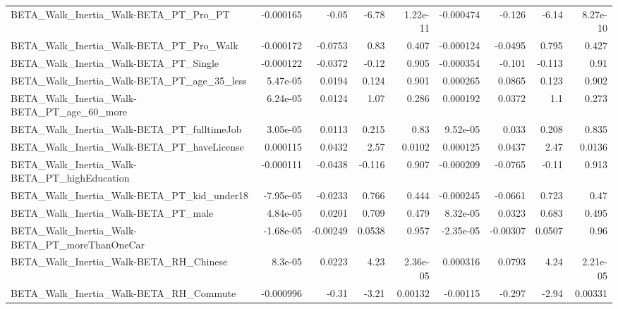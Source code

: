 \begin{tabular}{lrrrrrrrr}
BETA\_Walk\_Inertia\_Walk-BETA\_PT\_Pro\_PT              &   -0.000165 &        -0.05 &    -6.78 & 1.22e-11 &  -0.000474 &      -0.126 &        -6.14 &      8.27e-10 \\
BETA\_Walk\_Inertia\_Walk-BETA\_PT\_Pro\_Walk            &   -0.000172 &      -0.0753 &     0.83 &    0.407 &  -0.000124 &     -0.0495 &        0.795 &         0.427 \\
BETA\_Walk\_Inertia\_Walk-BETA\_PT\_Single              &   -0.000122 &      -0.0372 &    -0.12 &    0.905 &  -0.000354 &      -0.101 &       -0.113 &          0.91 \\
BETA\_Walk\_Inertia\_Walk-BETA\_PT\_age\_35\_less         &    5.47e-05 &       0.0194 &    0.124 &    0.901 &   0.000265 &      0.0865 &        0.123 &         0.902 \\
BETA\_Walk\_Inertia\_Walk-BETA\_PT\_age\_60\_more         &    6.24e-05 &       0.0124 &     1.07 &    0.286 &   0.000192 &      0.0372 &          1.1 &         0.273 \\
BETA\_Walk\_Inertia\_Walk-BETA\_PT\_fulltimeJob         &    3.05e-05 &       0.0113 &    0.215 &     0.83 &   9.52e-05 &       0.033 &        0.208 &         0.835 \\
BETA\_Walk\_Inertia\_Walk-BETA\_PT\_haveLicense         &    0.000115 &       0.0432 &     2.57 &   0.0102 &   0.000125 &      0.0437 &         2.47 &        0.0136 \\
BETA\_Walk\_Inertia\_Walk-BETA\_PT\_highEducation       &   -0.000111 &      -0.0438 &   -0.116 &    0.907 &  -0.000209 &     -0.0765 &        -0.11 &         0.913 \\
BETA\_Walk\_Inertia\_Walk-BETA\_PT\_kid\_under18         &   -7.95e-05 &      -0.0233 &    0.766 &    0.444 &  -0.000245 &     -0.0661 &        0.723 &          0.47 \\
BETA\_Walk\_Inertia\_Walk-BETA\_PT\_male                &    4.84e-05 &       0.0201 &    0.709 &    0.479 &   8.32e-05 &      0.0323 &        0.683 &         0.495 \\
BETA\_Walk\_Inertia\_Walk-BETA\_PT\_moreThanOneCar      &   -1.68e-05 &     -0.00249 &   0.0538 &    0.957 &  -2.35e-05 &    -0.00307 &       0.0507 &          0.96 \\
BETA\_Walk\_Inertia\_Walk-BETA\_RH\_Chinese             &     8.3e-05 &       0.0223 &     4.23 & 2.36e-05 &   0.000316 &      0.0793 &         4.24 &      2.21e-05 \\
BETA\_Walk\_Inertia\_Walk-BETA\_RH\_Commute             &   -0.000996 &        -0.31 &    -3.21 &  0.00132 &   -0.00115 &      -0.297 &        -2.94 &       0.00331 \\

\end{tabular}
